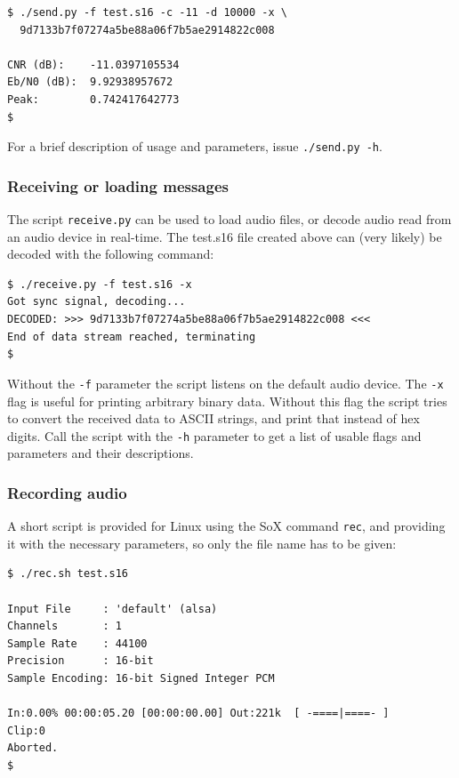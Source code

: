 \documentclass[a4paper]{article}
\begin{document}
\begin{lstlisting}
$ ./send.py -f test.s16 -c -11 -d 10000 -x \
  9d7133b7f07274a5be88a06f7b5ae2914822c008

CNR (dB):    -11.0397105534
Eb/N0 (dB):  9.92938957672
Peak:        0.742417642773
$
\end{lstlisting}

For a brief description of usage and parameters, issue 
\texttt{./send.py -h}.

\subsubsection{Receiving or loading messages}

The script \texttt{receive.py} can be used to load audio files, or 
decode audio read from an audio device in real-time. The test.s16 file 
created above can (very likely) be decoded with the following 
command:

\begin{lstlisting}
$ ./receive.py -f test.s16 -x
Got sync signal, decoding... 
DECODED: >>> 9d7133b7f07274a5be88a06f7b5ae2914822c008 <<<
End of data stream reached, terminating
$
\end{lstlisting}

Without the \texttt{-f} parameter the script listens on the default 
audio device. The \texttt{-x} flag is useful for printing arbitrary 
binary data. Without this flag the script tries to convert the received 
data to ASCII strings, and print that instead of hex digits. Call the 
script with the \texttt{-h} parameter to get a list of usable flags 
and parameters and their descriptions.

\subsubsection{Recording audio}

A short script is provided for Linux using the SoX command 
\texttt{rec}, and providing it with the necessary parameters, so only 
the file name has to be given:

\begin{lstlisting}
$ ./rec.sh test.s16

Input File     : 'default' (alsa)
Channels       : 1
Sample Rate    : 44100
Precision      : 16-bit
Sample Encoding: 16-bit Signed Integer PCM

In:0.00% 00:00:05.20 [00:00:00.00] Out:221k  [ -====|====- ]     Clip:0
Aborted.
$
\end{lstlisting}
\end{document}

